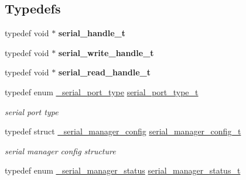 \subsection*{Typedefs}
\begin{DoxyCompactItemize}
\item 
\mbox{\label{group__serialmanager_gaba1cc3859c4f829ee0bc6091184d4b08}} 
typedef void $\ast$ {\bfseries serial\+\_\+handle\+\_\+t}
\item 
\mbox{\label{group__serialmanager_gac8319b6189019680778f230eb319530e}} 
typedef void $\ast$ {\bfseries serial\+\_\+write\+\_\+handle\+\_\+t}
\item 
\mbox{\label{group__serialmanager_ga8bfec9c49e40728806d775fdb4bbf78e}} 
typedef void $\ast$ {\bfseries serial\+\_\+read\+\_\+handle\+\_\+t}
\item 
\mbox{\label{group__serialmanager_gaa7dc5f93aacda72d14bb0fa66b0401f3}} 
typedef enum \mbox{\hyperlink{group__serialmanager_ga37012d03963b0a7aac96cda088362180}{\+\_\+serial\+\_\+port\+\_\+type}} \mbox{\hyperlink{group__serialmanager_gaa7dc5f93aacda72d14bb0fa66b0401f3}{serial\+\_\+port\+\_\+type\+\_\+t}}
\begin{DoxyCompactList}\small\item\em serial port type \end{DoxyCompactList}\item 
\mbox{\label{group__serialmanager_gaae9cb68d4f20901d9884b690d39a257a}} 
typedef struct \mbox{\hyperlink{struct__serial__manager__config}{\+\_\+serial\+\_\+manager\+\_\+config}} \mbox{\hyperlink{group__serialmanager_gaae9cb68d4f20901d9884b690d39a257a}{serial\+\_\+manager\+\_\+config\+\_\+t}}
\begin{DoxyCompactList}\small\item\em serial manager config structure \end{DoxyCompactList}\item 
\mbox{\label{group__serialmanager_gac1d9f848c57ca245ad9da8d049369da9}} 
typedef enum \mbox{\hyperlink{group__serialmanager_ga936dd06c6718edc81ad0423a2bb04ad8}{\+\_\+serial\+\_\+manager\+\_\+status}} \mbox{\hyperlink{group__serialmanager_gac1d9f848c57ca245ad9da8d049369da9}{serial\+\_\+manager\+\_\+status\+\_\+t}}

\end{DoxyCompactItemize}
